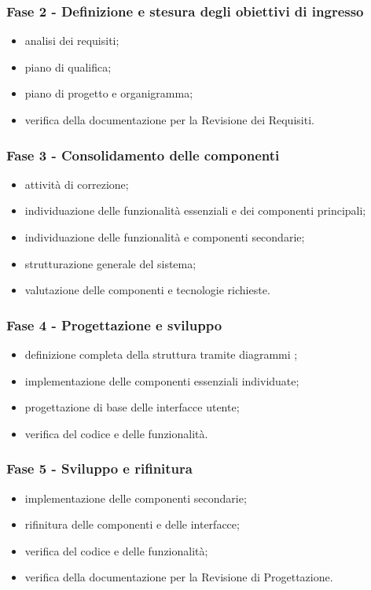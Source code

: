     \subsubsection{Fase 2 - Definizione e stesura degli obiettivi di ingresso}
        \begin{itemize}
            \item analisi dei requisiti;
            \item piano di qualifica;
            \item piano di progetto e organigramma;
            \item verifica della documentazione per la Revisione dei Requisiti.
        \end{itemize}
    
    \subsubsection{Fase 3 - Consolidamento delle componenti}
        \begin{itemize}
            \item attività di correzione;
            \item individuazione delle funzionalità essenziali e dei componenti principali;
            \item individuazione delle funzionalità e componenti secondarie;
            \item strutturazione generale del sistema;
            \item valutazione delle componenti e tecnologie richieste.
        \end{itemize}
    
    \subsubsection{Fase 4 - Progettazione e sviluppo}
        \begin{itemize}
            \item definizione completa della struttura tramite diagrammi ;
            \item implementazione delle componenti essenziali individuate;
            \item progettazione di base delle interfacce utente;
            \item verifica del codice e delle funzionalità.
        \end{itemize}

    \subsubsection{Fase 5 - Sviluppo e rifinitura }
        \begin{itemize}
            \item implementazione delle componenti secondarie;
            \item rifinitura delle componenti e delle interfacce;
            \item verifica del codice e delle funzionalità;
            \item verifica della documentazione per la Revisione di Progettazione.
        \end{itemize}

